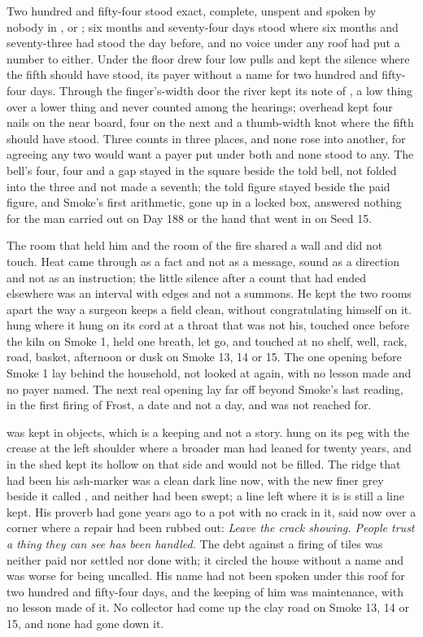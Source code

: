 Two hundred and fifty-four stood exact, complete, unspent and spoken by nobody in ,  or ; six months and seventy-four days stood where six months and seventy-three had stood the day before, and no voice under any roof had put a number to either. Under the floor  drew four low pulls and kept the silence where the fifth should have stood, its payer without a name for two hundred and fifty-four days. Through the finger's-width door the river kept its note of , a low thing over a lower thing and never counted among the hearings; overhead  kept four nails on the near board, four on the next and a thumb-width knot where the fifth should have stood. Three counts in three places, and none rose into another, for agreeing any two would want a payer put under both and none stood to any. The bell's four, four and a gap stayed in the square beside the told bell, not folded into the three and not made a seventh; the told figure stayed beside the paid figure, and Smoke's first arithmetic, gone up  in a locked box, answered nothing for the man carried out on Day 188 or the hand that went in on Seed 15.

The room that held him and the room of the fire shared a wall and did not touch. Heat came through as a fact and not as a message, sound as a direction and not as an instruction; the little silence after a count that had ended elsewhere was an interval with edges and not a summons. He kept the two rooms apart the way a surgeon keeps a field clean, without congratulating himself on it.  hung where it hung on its cord at a throat that was not his, touched once before the kiln on Smoke 1, held one breath, let go, and touched at no shelf, well, rack, road, basket, afternoon or dusk on Smoke 13, 14 or 15. The one opening before Smoke 1 lay behind the household, not looked at again, with no lesson made and no payer named. The next real opening lay far off beyond Smoke's last reading, in the first firing of Frost, a date and not a day, and was not reached for.

 was kept in objects, which is a keeping and not a story.  hung on its peg with the crease at the left shoulder where a broader man had leaned for twenty years, and  in the shed kept its hollow on that side and would not be filled. The ridge that had been his ash-marker was a clean dark line now, with the new finer grey beside it called , and neither had been swept; a line left where it is is still a line kept. His proverb had gone years ago to a pot with no crack in it, said now over a corner where a repair had been rubbed out: \emph{Leave the crack showing. People trust a thing they can see has been handled.} The debt against a firing of tiles was neither paid nor settled nor done with; it circled the house without a name and was worse for being uncalled. His name had not been spoken under this roof for two hundred and fifty-four days, and the keeping of him was maintenance, with no lesson made of it. No collector had come up the clay road on Smoke 13, 14 or 15, and none had gone down it.

